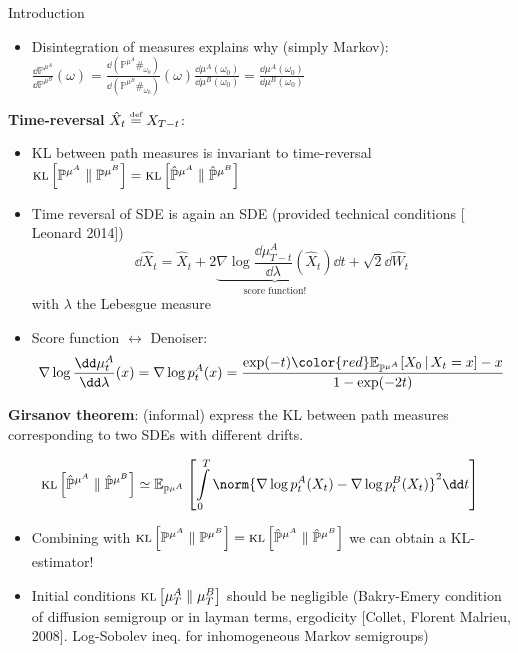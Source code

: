 \begin{frame}[allowframebreaks]{Introduction}
\begin{itemize}
\begin{equation}
 \KL{\mathbb{P}^{{\mu^A}}}{\mathbb{P}^{{\mu^B}}}=\E_{\mathbb{P}^{{\mu^A}}}\left[\log\frac{\dd\mathbb{P}^{{\mu^A}}}{\dd\mathbb{P}^{{\mu^B}}}\right]=\E_{\mathbb{P}^{{\mu^A}}}\left[\log\frac{\dd \mu^{A}}{\dd p^{B}}\right]=\KL{\mu^A}{\mu^B}  
\end{equation}
\item Disintegration of measures explains why (simply Markov): $\frac{\dd \mathbb{P}^{\mu^{A}}}{\dd \mathbb{P}^{\mu^{B}}} (\omega)=\frac{\dd \left(\mathbb{P}^{\mu^A}\#_{\omega_{0}}\right)}{\dd \left(\mathbb{P}^{\mu^B}\#_{\omega_{0}}\right)} (\omega)\frac{\dd \mu^A(\omega_{0})}{\dd \mu^B(\omega_{0})}=\frac{\dd \mu^A(\omega_{0})}{\dd \mu^B(\omega_{0})}$
\end{itemize}  
\framebreak
\textbf{Time-reversal} $\hat{X}_t\stackrel{\text{\tiny def}}{=} X_{T-t}$:
\begin{itemize}
    \item KL between path measures is invariant to time-reversal $\textsc{kl}\left[\mathbb{P}^{{\mu^A}}\;\|\;\mathbb{P}^{{\mu^B}}\right]=\textsc{kl}\left[\hat{\mathbb{P}}^{{\mu^A}}\;\|\;\hat{\mathbb{P}}^{{\mu^B}}\right]$
    \item Time reversal of SDE is again an SDE (provided technical conditions [ Leonard 2014])
    \begin{equation}
         \dd \hat X_t=\hat X_t+2 \underbrace{\nabla\log \frac{\dd\mu_{T-t}^A}{\dd \lambda}(\hat X_t)}_{\text{score function!}}\dd t+ \sqrt{2}\dd \hat W_t
    \end{equation}
    with $\lambda$ the Lebesgue measure
    \item Score function $\leftrightarrow$ Denoiser: \begin{equation}
        \nabla\log \frac{\dd\mu_t^A}{\dd \lambda}(x)=\nabla\log p^A_t(x)=\frac{ \exp(-t){\color{red}\E_{{\mathbb{P}^{{\mu^A}}}}[X_0\g X_t=x]}-x}{1-\exp(-2t)}
    \end{equation}
\end{itemize}


\framebreak
\textbf{Girsanov theorem}: (informal) express the KL between path measures corresponding to two \glspl{SDE} with different drifts.

\begin{equation}
  \KL{\hat{\mathbb{P}}^{\mu^{A}}}{\hat{\mathbb{P}}^{\mu^{B}}}\simeq  \E_{   {\mathbb{P}}^{\mu^A}}\left[\int\limits_0^T\norm{\nabla\log p^{A}_t(X_t)-\nabla\log p^{B}_t(X_t) }^2\dd t\right]
\end{equation}
\begin{itemize}
    \item Combining with $\textsc{kl}\left[\mathbb{P}^{{\mu^A}}\;\|\;\mathbb{P}^{{\mu^B}}\right]=\textsc{kl}\left[\hat{\mathbb{P}}^{{\mu^A}}\;\|\;\hat{\mathbb{P}}^{{\mu^B}}\right]$ we can obtain a KL-estimator!
\item Initial conditions $\textsc{kl}\left[\mu^A_T\;\|\;\mu^B_T\right]$ should be negligible (Bakry-Emery condition of diffusion semigroup or in layman terms, ergodicity [Collet, Florent Malrieu, 2008]. Log-Sobolev ineq. for inhomogeneous
Markov semigroups)
\end{itemize}

\end{frame}


